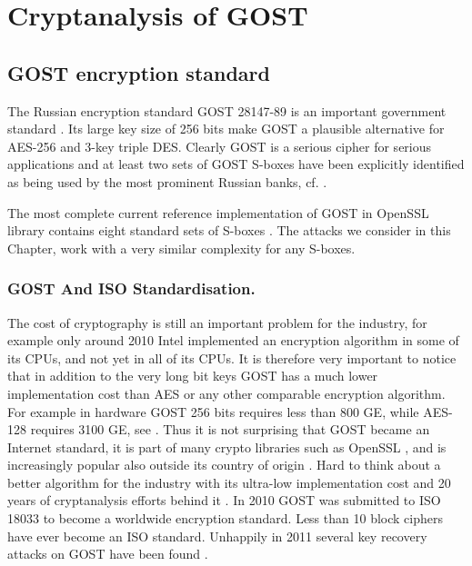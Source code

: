 
\chapter{Cryptanalysis of GOST}\label{ch:GOST}

\section{GOST encryption standard}
The Russian encryption standard
GOST 28147-89 %
is an important government standard
\cite{gost198928147}.
Its large key size of 256 bits
make GOST a plausible alternative for AES-256
and 3-key triple DES.
Clearly GOST is a serious cipher for serious applications
and at least two sets of GOST S-boxes have been explicitly identified
as being used by the most prominent Russian banks, %
cf. \cite{schneier2007applied,GOSTRussianReferenceImplementation}.

The most complete current reference implementation of GOST in OpenSSL library contains eight standard sets of S-boxes
\cite{GOSTRussianReferenceImplementation}. The attacks we consider in this Chapter, work with a very similar complexity for any S-boxes. %

\subsection{GOST And ISO Standardisation.}
The cost of cryptography is still an important problem for the industry,
for example only around 2010 Intel implemented an encryption algorithm
in some of its CPUs, and not yet in all of its CPUs.
It is therefore very important to notice that
in addition to the very long bit keys
GOST has a much lower implementation cost
than AES or any other comparable encryption algorithm.
For example in hardware GOST 256 bits requires less than 800 GE,
while AES-128 requires 3100 GE, see \cite{PoschmannImplement}.
Thus it is not surprising that GOST became an Internet standard,
it is part of many crypto libraries such as OpenSSL
\cite{GOSTRussianReferenceImplementation}, %
and is increasingly popular %
also outside its country of origin
\cite{PoschmannImplement}.
Hard to think about a better algorithm for the industry
with its ultra-low implementation cost and
20 years of cryptanalysis efforts behind it \cite{PoschmannImplement}.
In 2010 GOST was submitted to ISO 18033
to become a worldwide encryption standard.
Less than 10
block ciphers have ever become an
ISO %
standard.
Unhappily in 2011 several key recovery attacks on GOST have been found
\cite{JapaneseGOSTMITMFSE2011,gostreport,gostac,gostdc0,gostdc2}.

